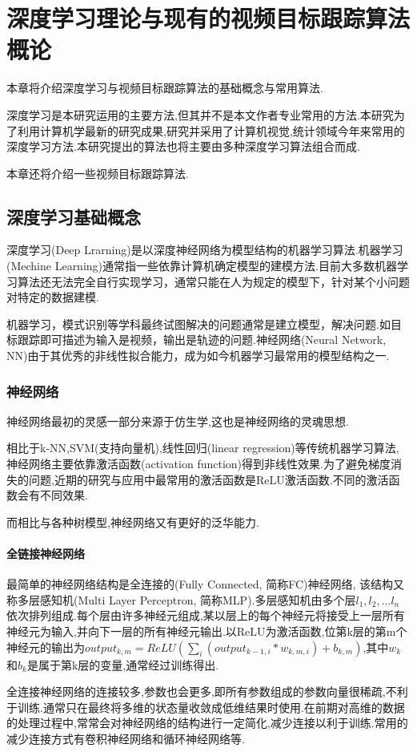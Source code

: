 
\chapter{深度学习理论与现有的视频目标跟踪算法概论}
本章将介绍深度学习与视频目标跟踪算法的基础概念与常用算法.
\par
深度学习是本研究运用的主要方法,但其并不是本文作者专业常用的方法.本研究为了利用计算机学最新的研究成果,研究并采用了计算机视觉,统计领域今年来常用的深度学习方法.本研究提出的算法也将主要由多种深度学习算法组合而成.
\par
本章还将介绍一些视频目标跟踪算法.

\section{深度学习基础概念}
深度学习(Deep Lrarning)是以深度神经网络为模型结构的机器学习算法\supercite{deng2014deep}.机器学习(Mechine Learning)通常指一些依靠计算机确定模型的建模方法.目前大多数机器学习算法还无法完全自行实现学习，通常只能在人为规定的模型下，针对某个小问题对特定的数据建模.
\par
机器学习，模式识别等学科最终试图解决的问题通常是建立模型，解决问题.如目标跟踪即可描述为输入是视频，输出是轨迹的问题.神经网络(Neural Network, NN)由于其优秀的非线性拟合能力，成为如今机器学习最常用的模型结构之一.
\subsection{神经网络}
神经网络最初的灵感一部分来源于仿生学\supercite{mcculloch1943logical}\supercite{farley1954simulation},这也是神经网络的灵魂思想.
\par
相比于k-NN,SVM(支持向量机),线性回归(linear regression)等传统机器学习算法,神经网络主要依靠激活函数(activation function)得到非线性效果.为了避免梯度消失的问题,近期的研究与应用中最常用的激活函数是ReLU激活函数\supercite{krizhevsky2012imagenet}.不同的激活函数会有不同效果\supercite{karlik2011performance}.
\par
而相比与各种树模型,神经网络又有更好的泛华能力.
\par
\subsubsection{全链接神经网络}
\par
最简单的神经网络结构是全连接的(Fully Connected, 简称FC)神经网络, 该结构又称多层感知机(Multi Layer Perceptron, 简称MLP).多层感知机由多个层$l_1,l_2,...l_n$依次排列组成.每个层由许多神经元组成,某以层上的每个神经元将接受上一层所有神经元为输入,并向下一层的所有神经元输出.以ReLU为激活函数,位第k层的第m个神经元的输出为$output_{k,m}=ReLU(\sum_{i} (output_{k-1,i}*w_{k,m,i})+b_{k,m})$,其中$w_{k}$和$b_{k}$是属于第k层的变量,通常经过训练得出.
\par
全连接神经网络的连接较多,参数也会更多,即所有参数组成的参数向量很稀疏,不利于训练.通常只在最终将多维的状态量收敛成低维结果时使用.在前期对高维的数据的处理过程中,常常会对神经网络的结构进行一定简化,减少连接以利于训练.常用的减少连接方式有卷积神经网络和循环神经网络等.
\par
